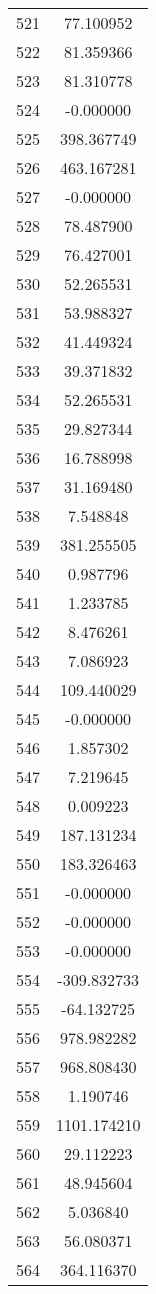 \documentclass[12pt]{article}
\begin{document}
\begin{longtable}{@{}cc@{}}
521 & 77.100952 \\
522 & 81.359366 \\
523 & 81.310778 \\
524 & -0.000000 \\
525 & 398.367749 \\
526 & 463.167281 \\
527 & -0.000000 \\
528 & 78.487900 \\
529 & 76.427001 \\
530 & 52.265531 \\
531 & 53.988327 \\
532 & 41.449324 \\
533 & 39.371832 \\
534 & 52.265531 \\
535 & 29.827344 \\
536 & 16.788998 \\
537 & 31.169480 \\
538 & 7.548848 \\
539 & 381.255505 \\
540 & 0.987796 \\
541 & 1.233785 \\
542 & 8.476261 \\
543 & 7.086923 \\
544 & 109.440029 \\
545 & -0.000000 \\
546 & 1.857302 \\
547 & 7.219645 \\
548 & 0.009223 \\
549 & 187.131234 \\
550 & 183.326463 \\
551 & -0.000000 \\
552 & -0.000000 \\
553 & -0.000000 \\
554 & -309.832733 \\
555 & -64.132725 \\
556 & 978.982282 \\
557 & 968.808430 \\
558 & 1.190746 \\
559 & 1101.174210 \\
560 & 29.112223 \\
561 & 48.945604 \\
562 & 5.036840 \\
563 & 56.080371 \\
564 & 364.116370 \\

\end{longtable}
\end{document}
